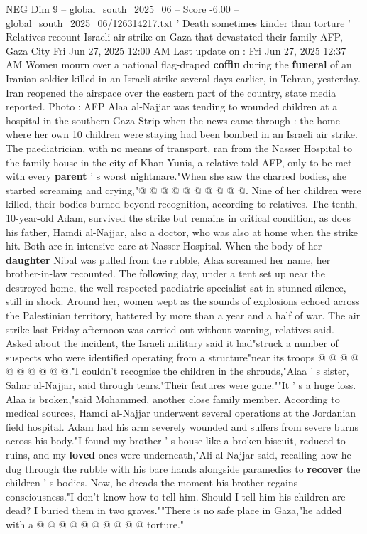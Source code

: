 \begin{textsample}{NEG Dim 9 – global\_south\_2025\_06 – Score -6.00 – global\_south\_2025\_06/126314217.txt}  \label{ex:f9_neg_253}
' Death sometimes kinder than torture ' Relatives recount Israeli air strike on Gaza that devastated their family AFP, Gaza City Fri Jun 27, 2025 12:00 AM Last update on : Fri Jun 27, 2025 12:37 AM Women mourn over a national flag-draped \textbf{coffin} during the \textbf{funeral} of an Iranian soldier killed in an Israeli strike several days earlier, in Tehran, yesterday.
Iran reopened the airspace over the eastern part of the country, state media reported.
Photo : AFP Alaa al-Najjar was tending to wounded children at a hospital in the southern Gaza Strip when the news came through : the home where her own 10 children were staying had been bombed in an Israeli air strike.
The paediatrician, with no means of transport, ran from the Nasser Hospital to the family house in the city of Khan Yunis, a relative told AFP, only to be met with every \textbf{parent} ' s worst nightmare."When she saw the charred bodies, she started screaming and crying,"@ @ @ @ @ @ @ @ @ @.
Nine of her children were killed, their bodies burned beyond recognition, according to relatives.
The tenth, 10-year-old Adam, survived the strike but remains in critical condition, as does his father, Hamdi al-Najjar, also a doctor, who was also at home when the strike hit.
Both are in intensive care at Nasser Hospital.
When the body of her \textbf{daughter} Nibal was pulled from the rubble, Alaa screamed her name, her brother-in-law recounted.
The following day, under a tent set up near the destroyed home, the well-respected paediatric specialist sat in stunned silence, still in shock.
Around her, women wept as the sounds of explosions echoed across the Palestinian territory, battered by more than a year and a half of war.
The air strike last Friday afternoon was carried out without warning, relatives said.
Asked about the incident, the Israeli military said it had"struck a number of suspects who were identified operating from a structure"near its troops @ @ @ @ @ @ @ @ @ @."I couldn't recognise the children in the shrouds,"Alaa ' s sister, Sahar al-Najjar, said through tears."Their features were gone.""It ' s a huge loss.
Alaa is broken,"said Mohammed, another close family member.
According to medical sources, Hamdi al-Najjar underwent several operations at the Jordanian field hospital.
Adam had his arm severely wounded and suffers from severe burns across his body."I found my brother ' s house like a broken biscuit, reduced to ruins, and my \textbf{loved} ones were underneath,"Ali al-Najjar said, recalling how he dug through the rubble with his bare hands alongside paramedics to \textbf{recover} the children ' s bodies.
Now, he dreads the moment his brother regains consciousness."I don't know how to tell him.
Should I tell him his children are dead?
I buried them in two graves.""There is no safe place in Gaza,"he added with a @ @ @ @ @ @ @ @ @ @ torture."

\end{textsample}
